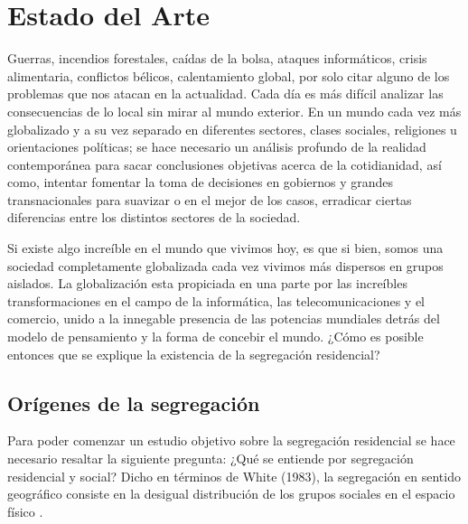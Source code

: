 
\chapter{Estado del Arte}
Guerras, incendios forestales, caídas de la bolsa, ataques informáticos, crisis alimentaria, conflictos bélicos, calentamiento global, por solo citar alguno de los problemas que nos atacan en la actualidad. Cada día es más difícil analizar las consecuencias de lo local sin mirar al mundo exterior. En un mundo cada vez más globalizado y a su vez separado en diferentes sectores, clases sociales, religiones u orientaciones políticas; se hace necesario un análisis profundo de la realidad contemporánea para sacar conclusiones objetivas acerca de la cotidianidad, así como, intentar fomentar la toma de decisiones en gobiernos y grandes transnacionales para suavizar o en el mejor de los casos, erradicar ciertas diferencias entre los distintos sectores de la sociedad.

Si existe algo increíble en el mundo que vivimos hoy, es que si bien, somos una sociedad completamente globalizada cada vez vivimos más dispersos en grupos aislados. La globalización esta propiciada en una parte por las increíbles transformaciones en el campo de la informática, las telecomunicaciones y el comercio, unido a la innegable presencia de las potencias mundiales detrás del modelo de pensamiento y la forma de concebir el mundo. ¿Cómo es posible entonces que se explique la existencia de la segregación residencial?

\section{Orígenes de la segregación}

Para poder comenzar un estudio objetivo sobre la segregación residencial se hace necesario resaltar la siguiente pregunta: ¿Qué se entiende por segregación residencial y social? Dicho en términos de White (1983), la segregación en sentido geográfico consiste en la desigual distribución de los grupos sociales en el espacio físico \cite{Rodrguez2008SegregacinRS}. 

